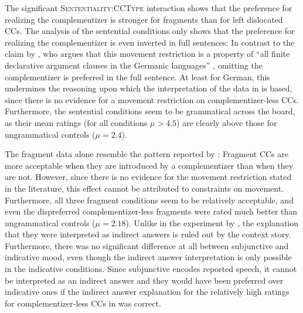 The significant \textsc{Sententiality:CCType} interaction shows that the preference for realizing the complementizer is stronger for fragments than for left dislocated CCs. The analysis of the sentential conditions only shows that the preference for realizing the complementizer is even inverted in full sentences: In contrast to the claim by \citet{webelhuth1992}, who argues that this movement restriction is a property of ``all finite declarative argument clauses in the Germanic languages'' \citep[83]{webelhuth1992}, omitting the complementizer is preferred in the full sentence. At least for German, this undermines the reasoning upon which the interpretation of the data in \citet{merchant.etal2013} is based, since there is no evidence for a movement restriction on complementizer-less CCs. Furthermore, the sentential conditions seem to be grammatical across the board, as their mean ratings (for all conditions $\mu > 4.5$) are clearly above those for ungrammatical controls ($\mu = 2.4$). 

The fragment data alone resemble the pattern reported by \citet{merchant.etal2013}: Fragment CCs are more acceptable when they are introduced by a complementizer than when they are not. However, since there is no evidence for the movement restriction stated in the literature, this effect cannot be attributed to constraints on movement. Furthermore, all three fragment conditions seem to be relatively acceptable, and even the dispreferred complementizer-less fragments were rated much better than ungrammatical controls ($\mu = 2.18$). Unlike in the experiment by \citet{merchant.etal2013}, the explanation that they were interpreted as indirect answers is ruled out by the context story. Furthermore, there was no significant difference at all between subjunctive and indicative mood, even though the indirect answer interpretation is only possible in the indicative conditions. Since subjunctive encodes reported speech,  it cannot be interpreted as an indirect answer and they would have been preferred over indicative ones if the indirect answer explanation for the relatively high ratings for complementizer-less CCs in \citet{merchant.etal2013} was correct.

